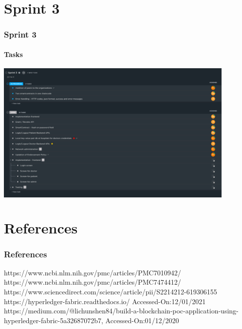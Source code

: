 \documentclass[english,hangout]{beamer}
\begin{document}
\section{Sprint 3}

\begin{frame}[fragile]
 \frametitle{Sprint 3}
 \framesubtitle{Tasks}
    \begin{center}
        \vspace{-1.2em}
            \includegraphics[height=7cm]{sprint 3_tickets.PNG}
        \end{center}
\end{frame}



\section{References}

\begin{frame}
\frametitle{References}
\begin{thebibliography}{00}
 https://www.ncbi.nlm.nih.gov/pmc/articles/PMC7010942/
 https://www.ncbi.nlm.nih.gov/pmc/articles/PMC7474412/
 https://www.sciencedirect.com/science/article/pii/S2214212-619306155
 https://hyperledger-fabric.readthedocs.io/ Accessed-On:12/01/2021
 https://medium.com/@lichunshen84/build-a-blockchain-poc-application-using-hyperledger-fabric-5a32687072b7, Accessed-On:01/12/2020
\end{thebibliography}

\end{frame}
\end{document}
